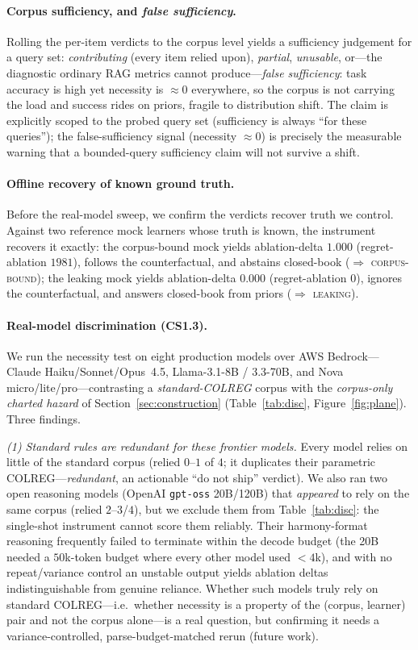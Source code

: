 \documentclass{article}
\begin{document}
\paragraph{Corpus sufficiency, and \emph{false sufficiency}.} Rolling the per-item verdicts to the
corpus level yields a sufficiency judgement for a query set: \emph{contributing} (every item
relied upon), \emph{partial}, \emph{unusable}, or---the diagnostic ordinary RAG metrics cannot
produce---\emph{false sufficiency}: task accuracy is high yet necessity is $\approx 0$ everywhere,
so the corpus is not carrying the load and success rides on priors, fragile to distribution shift.
The claim is explicitly scoped to the probed query set (sufficiency is always ``for these
queries''); the false-sufficiency signal (necessity $\approx 0$) is precisely the measurable
warning that a bounded-query sufficiency claim will not survive a shift.

\paragraph{Offline recovery of known ground truth.} Before the real-model sweep, we confirm the
verdicts recover truth we control. Against two reference mock learners
whose truth is known, the instrument recovers it exactly: the corpus-bound mock yields
ablation-delta $1.000$ (regret-ablation $1981$), follows the counterfactual, and abstains
closed-book ($\Rightarrow$ \textsc{corpus-bound}); the leaking mock yields ablation-delta
$0.000$ (regret-ablation $0$), ignores the counterfactual, and answers closed-book from
priors ($\Rightarrow$ \textsc{leaking}).

\paragraph{Real-model discrimination (CS1.3).} We run the necessity test on eight production models over AWS
Bedrock---Claude Haiku/Sonnet/Opus~4.5, Llama-3.1-8B / 3.3-70B, and Nova micro/lite/pro---contrasting a
\emph{standard-COLREG} corpus with the \emph{corpus-only charted hazard} of Section~\ref{sec:construction}
(Table~\ref{tab:disc}, Figure~\ref{fig:plane}). Three findings.

\emph{(1) Standard rules are redundant for these frontier models.} Every model relies on little of the
standard corpus (relied $0$--$1$ of $4$; it duplicates their parametric COLREG---\emph{redundant}, an
actionable ``do not ship'' verdict). We also ran two open reasoning models (OpenAI \texttt{gpt-oss}
20B/120B) that \emph{appeared} to rely on the same corpus (relied $2$--$3$/$4$), but we exclude them from
Table~\ref{tab:disc}: the single-shot instrument cannot score them reliably. Their harmony-format
reasoning frequently failed to terminate within the decode budget (the 20B needed a $50$k-token budget
where every other model used $<\!4$k), and with no repeat/variance control an unstable output yields
ablation deltas indistinguishable from genuine reliance. Whether such models truly rely on standard
COLREG---i.e.\ whether necessity is a property of the (corpus, learner) pair and not the corpus alone---is
a real question, but confirming it needs a variance-controlled, parse-budget-matched rerun (future work).
\end{document}
